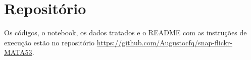 \section{Repositório}
\label{sec:repositorio}

Os códigos, o notebook, os dados tratados e o README com as instruções de execução estão no repositório \url{https://github.com/Augustocfq/snap-flickr-MATA53}.
